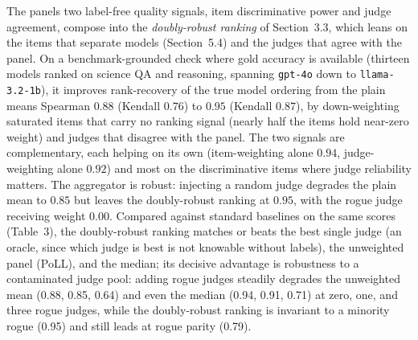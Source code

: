 The panel\textquotesingle s two label-free quality signals, item discriminative power and judge agreement, compose into the
\emph{doubly-robust ranking} of Section~3.3, which leans on the items that separate models (Section~5.4)
and the judges that agree with the panel. On a benchmark-grounded check where gold accuracy is available (thirteen
models ranked on science QA and reasoning, spanning \texttt{gpt-4o} down to \texttt{llama-3.2-1b}), it improves
rank-recovery of the true model ordering from the plain mean\textquotesingle s Spearman \(0.88\) (Kendall \(0.76\)) to
\textbf{\(0.95\)} (Kendall \(0.87\)), by down-weighting saturated items that carry no ranking signal (nearly half
the items hold near-zero weight) and judges that disagree with the panel. The two signals are complementary, each
helping on its own (item-weighting alone \(0.94\), judge-weighting alone \(0.92\)) and most on the discriminative items
where judge reliability matters. The aggregator is robust: injecting a random judge degrades the plain mean to \(0.85\)
but leaves the doubly-robust ranking at \(0.95\), with the rogue judge receiving weight \(0.00\). Compared against standard
baselines on the same scores (Table~3), the doubly-robust ranking matches or beats the best single judge (an
oracle, since which judge is best is not knowable without labels), the unweighted panel (PoLL), and the median; its
decisive advantage is robustness to a contaminated judge pool: adding rogue judges steadily degrades the unweighted
mean (0.88, 0.85, 0.64) and even the median (0.94, 0.91, 0.71) at zero, one, and three rogue judges, while the
doubly-robust ranking is invariant to a minority rogue (0.95) and still leads at rogue parity (0.79).

